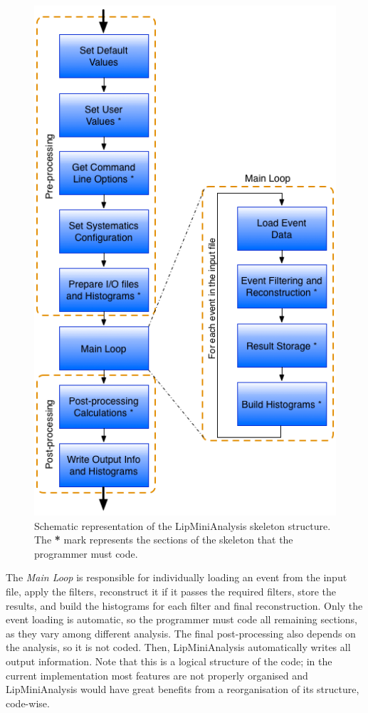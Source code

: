 \begin{figure}[!htp]
	\begin{center}
		\includegraphics[scale=0.5]{imgs/lipminianalysis.png}
		\caption{Schematic representation of the LipMiniAnalysis skeleton structure. The \textbf{*} mark represents the sections of the skeleton that the programmer must code.}
		\label{fig:lipmini}
	\end{center}
\end{figure}

The \textit{Main Loop} is responsible for individually loading an event from the input file, apply the filters, reconstruct it if it passes the required filters, store the results, and build the histograms for each filter and final reconstruction. Only the event loading is automatic, so the programmer must code all remaining sections, as they vary among different analysis. The final post-processing also depends on the analysis, so it is not coded. Then, LipMiniAnalysis automatically writes all output information. Note that this is a logical structure of the code; in the current implementation most features are not properly organised and LipMiniAnalysis would have great benefits from a reorganisation of its structure, code-wise.

